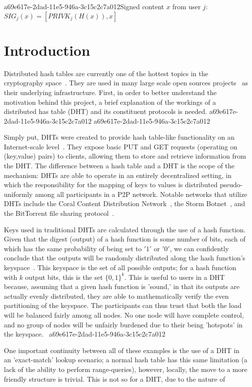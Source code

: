 \documentclass[12pt]{article}
\begin{document}
a69e617e-2dad-11e5-946a-3c15c2c7a012Signed content $x$ from user $j$: $SIG_j(x) = \left[ PRIVK_j( H(x) ), x \right]$

\section{Introduction}
\par Distributed hash tables are currently one of the hottest topics in the cryptography space~\cite{Stoica:2001dj,Rowstron:2001ea,Ratnasamy:2001wn}. They are used in many large scale open sources projects~\cite{Freitas:2013tb,Xu:2010vs,Perfitt:2010fh} as their underlying infrastructure. First, in order to better understand the motivation behind this project, a brief explanation of the workings of a distributed has table (DHT) and its constituent protocols is needed.
a69e617e-2dad-11e5-946a-3c15c2c7a012
a69e617e-2dad-11e5-946a-3c15c2c7a012\par Simply put, DHTs were created to provide hash table-like functionality on an Internet-scale level~\cite{Ratnasamy:2001wn}. They expose basic PUT and GET requests (operating on (key,value) pairs) to clients, allowing them to store and retrieve information from the DHT. The difference between a hash table and a DHT is the scope of the mechanism: DHTs are able to operate in an entirely decentralized setting, in which the responsibility for the mapping of keys to values is distributed pseudo-uniformly among all participants in a P2P network. Notable networks that utilize DHTs include the Coral Content Distribution Network~\cite{Freedman:2004vb}, the Storm Botnet~\cite{Holz:2008uk}, and the BitTorrent file sharing protocol~\cite{Cohen:y1_8mBnw}.

\par Keys used in traditional DHTs are calculated through the use of a hash function. Given that the digest (output) of a hash function is some number of bits, each of which has the same probability of being set to $'1'$ or $'0'$, we can confidently conclude that the outputs will be randomly distributed along the hash function's keyspace~. This keyspace is the set of all possible outputs; for a hash function with $k$ output bits, this is the set $\{0,1\}^k$. This is useful to users in a DHT because, assuming that a given hash function is 'sound,' in that its outputs are actually evenly distributed, they are able to mathematically verify the even partitioning of the keyspace. The participants can thus trust that both the load will be balanced fairly among all nodes. No one node will have complete control, and no group of nodes will be unfairly burdened due to their being 'hotspots' in the keyspace.~
a69e617e-2dad-11e5-946a-3c15c2c7a012
\par One important continuity between all of these examples is the use of a DHT in an 'exact-match' lookup scenario; a normal hash table has this same limitation (a lack of the ability to perform range-queries), however, locally, the move to a more friendly structure is trivial. This is not so for a DHT, due to the nature of
\printbibliography
\end{document}
